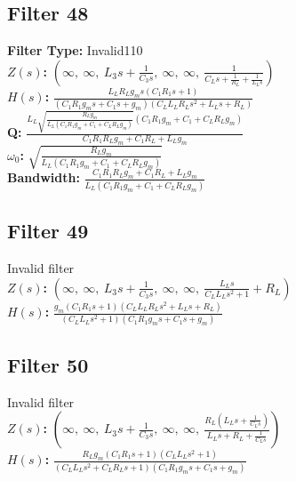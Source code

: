 \documentclass{article}
\begin{document}
\subsection*{Filter 48}
\textbf{Filter Type:} Invalid110 \\ 
\textbf{$Z(s)$:} $\left( \infty, \  \infty, \  L_{3} s + \frac{1}{C_{3} s}, \  \infty, \  \infty, \  \frac{1}{C_{L} s + \frac{1}{R_{L}} + \frac{1}{L_{L} s}}\right)$ \\ 
\textbf{$H(s)$:} $\frac{L_{L} R_{L} g_{m} s \left(C_{1} R_{1} s + 1\right)}{\left(C_{1} R_{1} g_{m} s + C_{1} s + g_{m}\right) \left(C_{L} L_{L} R_{L} s^{2} + L_{L} s + R_{L}\right)}$ \\ 
\textbf{Q:} $\frac{L_{L} \sqrt{\frac{R_{L} g_{m}}{L_{L} \left(C_{1} R_{1} g_{m} + C_{1} + C_{L} R_{L} g_{m}\right)}} \left(C_{1} R_{1} g_{m} + C_{1} + C_{L} R_{L} g_{m}\right)}{C_{1} R_{1} R_{L} g_{m} + C_{1} R_{L} + L_{L} g_{m}}$ \\ 
\textbf{$\omega_0$:} $\sqrt{\frac{R_{L} g_{m}}{L_{L} \left(C_{1} R_{1} g_{m} + C_{1} + C_{L} R_{L} g_{m}\right)}}$ \\ 
\textbf{Bandwidth:} $\frac{C_{1} R_{1} R_{L} g_{m} + C_{1} R_{L} + L_{L} g_{m}}{L_{L} \left(C_{1} R_{1} g_{m} + C_{1} + C_{L} R_{L} g_{m}\right)}$ \\ 
\subsection*{Filter 49}
Invalid filter \\ 
\textbf{$Z(s)$:} $\left( \infty, \  \infty, \  L_{3} s + \frac{1}{C_{3} s}, \  \infty, \  \infty, \  \frac{L_{L} s}{C_{L} L_{L} s^{2} + 1} + R_{L}\right)$ \\ 
\textbf{$H(s)$:} $\frac{g_{m} \left(C_{1} R_{1} s + 1\right) \left(C_{L} L_{L} R_{L} s^{2} + L_{L} s + R_{L}\right)}{\left(C_{L} L_{L} s^{2} + 1\right) \left(C_{1} R_{1} g_{m} s + C_{1} s + g_{m}\right)}$ \\ 
\subsection*{Filter 50}
Invalid filter \\ 
\textbf{$Z(s)$:} $\left( \infty, \  \infty, \  L_{3} s + \frac{1}{C_{3} s}, \  \infty, \  \infty, \  \frac{R_{L} \left(L_{L} s + \frac{1}{C_{L} s}\right)}{L_{L} s + R_{L} + \frac{1}{C_{L} s}}\right)$ \\ 
\textbf{$H(s)$:} $\frac{R_{L} g_{m} \left(C_{1} R_{1} s + 1\right) \left(C_{L} L_{L} s^{2} + 1\right)}{\left(C_{L} L_{L} s^{2} + C_{L} R_{L} s + 1\right) \left(C_{1} R_{1} g_{m} s + C_{1} s + g_{m}\right)}$ \\ 
\end{document}
